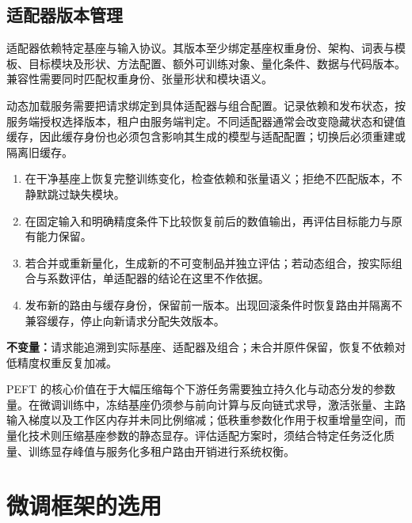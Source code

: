 \documentclass[../textbook.tex]{subfiles}
\begin{document}
\subsection{适配器版本管理}
适配器依赖特定基座与输入协议。其版本至少绑定基座权重身份、架构、词表与模板、目标模块及形状、方法配置、额外可训练对象、量化条件、数据与代码版本。兼容性需要同时匹配权重身份、张量形状和模块语义。

动态加载服务需要把请求绑定到具体适配器与组合配置。记录依赖和发布状态，按服务端授权选择版本，租户由服务端判定。不同适配器通常会改变隐藏状态和键值缓存，因此缓存身份也必须包含影响其生成的模型与适配配置；切换后必须重建或隔离旧缓存。

\begin{algorithm}[适配器发布与恢复]
\begin{enumerate}
\item 在干净基座上恢复完整训练变化，检查依赖和张量语义；拒绝不匹配版本，不静默跳过缺失模块。
\item 在固定输入和明确精度条件下比较恢复前后的数值输出，再评估目标能力与原有能力保留。
\item 若合并或重新量化，生成新的不可变制品并独立评估；若动态组合，按实际组合与系数评估，单适配器的结论在这里不作依据。
\item 发布新的路由与缓存身份，保留前一版本。出现回滚条件时恢复路由并隔离不兼容缓存，停止向新请求分配失效版本。
\end{enumerate}
\textbf{不变量：}请求能追溯到实际基座、适配器及组合；未合并原件保留，恢复不依赖对低精度权重反复加减。
\end{algorithm}

\begin{note}[参数效率的物理本质与显存构成]
PEFT 的核心价值在于大幅压缩每个下游任务需要独立持久化与动态分发的参数量。在微调训练中，冻结基座仍须参与前向计算与反向链式求导，激活张量、主路输入梯度以及工作区内存并未同比例缩减；低秩重参数化作用于权重增量空间，而量化技术则压缩基座参数的静态显存。评估适配方案时，须结合特定任务泛化质量、训练显存峰值与服务化多租户路由开销进行系统权衡。
\end{note}





\section{微调框架的选用}
\end{document}
